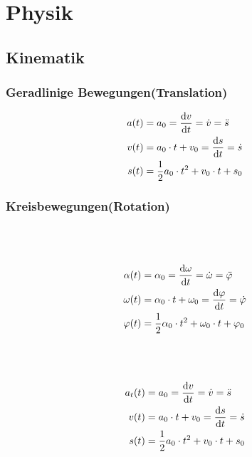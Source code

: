 \chapter{Physik}
\section{Kinematik}
\subsection{Geradlinige Bewegungen(Translation)}

\begin{shaded}
\begin{align}
	a(t)&=a_0=\frac{\mathop{}\!\mathrm{d} v}{\mathop{}\!\mathrm{d} t}=\dot{v}=\ddot{s} \\
	v(t)&=a_0\cdot t+v_0=\frac{\mathop{}\!\mathrm{d} s}{\mathop{}\!\mathrm{d} t}=\dot{s} \\
	s(t)&=\frac{1}{2}a_0\cdot t^2+v_0\cdot t+s_0
\end{align}
\end{shaded}

\subsection{Kreisbewegungen(Rotation)}

\begin{boxleft}
\\
\\
\end{boxleft}\begin{boxrightshaded}
\begin{align}
\alpha(t)&=\alpha_0=\frac{\mathop{}\!\mathrm{d} \omega}{\mathop{}\!\mathrm{d} t}=\dot{\omega}=\ddot{\varphi} \\
\omega(t)&=\alpha_0\cdot t+\omega_0=\frac{\mathop{}\!\mathrm{d} \varphi}{\mathop{}\!\mathrm{d} t}=\dot{\varphi} \\
\varphi(t)&=\frac{1}{2}\alpha_0\cdot t^2+\omega_0\cdot t+\varphi_0
\end{align}
\end{boxrightshaded}

\begin{boxleft}
\\
\\
\end{boxleft}\begin{boxrightshaded}
\begin{align}
a_t(t)&=a_0=\frac{\mathop{}\!\mathrm{d} v}{\mathop{}\!\mathrm{d} t}=\dot{v}=\ddot{s} \\
v(t)&=a_0\cdot t+v_0=\frac{\mathop{}\!\mathrm{d} s}{\mathop{}\!\mathrm{d} t}=\dot{s} \\
s(t)&=\frac{1}{2}a_0\cdot t^2+v_0\cdot t+s_0
\end{align}
\end{boxrightshaded}

